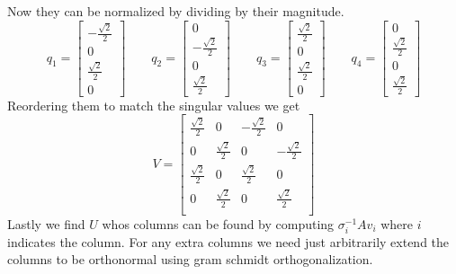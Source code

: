 \documentclass{article}
\begin{document}
Now they can be normalized by dividing by their magnitude.
$$
q_1
=
\begin{bmatrix}
-\frac{\sqrt{2}}{2}\\
0\\
\frac{\sqrt{2}}{2}\\
0
\end{bmatrix}
\qquad
q_2
=
\begin{bmatrix}
0\\
-\frac{\sqrt{2}}{2}\\
0\\
\frac{\sqrt{2}}{2}
\end{bmatrix}
\qquad
q_3
=
\begin{bmatrix}
\frac{\sqrt{2}}{2}\\
0\\
\frac{\sqrt{2}}{2}\\
0
\end{bmatrix}
\qquad
q_4
=
\begin{bmatrix}
0\\
\frac{\sqrt{2}}{2}\\
0\\
\frac{\sqrt{2}}{2}
\end{bmatrix}
$$
Reordering them to match the singular values we get
$$
V
=
\begin{bmatrix}
\frac{\sqrt{2}}{2} & 0 & -\frac{\sqrt{2}}{2} & 0 \\
0 & \frac{\sqrt{2}}{2} & 0 & -\frac{\sqrt{2}}{2} \\
\frac{\sqrt{2}}{2} & 0 & \frac{\sqrt{2}}{2} & 0 \\
0 & \frac{\sqrt{2}}{2} & 0 & \frac{\sqrt{2}}{2} \\
\end{bmatrix}
$$
Lastly we find $U$ whos columns can be found by computing $\sigma_i^{-1}Av_i$ where $i$ indicates the column.
For any extra columns we need just arbitrarily extend the columns to be orthonormal using gram schmidt orthogonalization.
\end{document}
